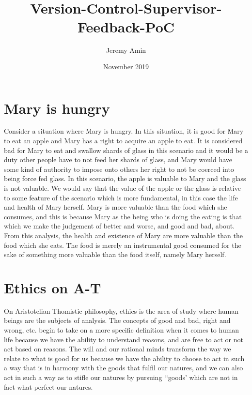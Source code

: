 \documentclass{article}
\title{Version-Control-Supervisor-Feedback-PoC}
\author{Jeremy Amin}
\date{November 2019}
\begin{document}
\maketitle
\tableofcontents

\pagebreak

\section{Mary is hungry}

Consider a situation where Mary is hungry. In this situation, it is good for Mary to eat an apple and Mary has a right to acquire an apple to eat. It is considered bad for Mary to eat and swallow shards of glass in this scenario and it would be a duty other people have to not feed her shards of glass, and Mary would have some kind of authority to impose onto others her right to not be coerced into being force fed glass. In this scenario, the apple is valuable to Mary and the glass is not valuable. We would say that the value of the apple or the glass is relative to some feature of the scenario which is more fundamental, in this case the life and health of Mary herself. Mary is more valuable than the food which she consumes, and this is because Mary as the being who is doing the eating is that which we make the judgement of better and worse, and good and bad, about. From this analysis, the health and existence of Mary are more valuable than the food which she eats. The food is merely an instrumental good consumed for the sake of something more valuable than the food itself, namely Mary herself.

\section{Ethics on A-T}

On Aristotelian-Thomistic philosophy, ethics is the area of study where human beings are the subjects of analysis. The concepts of good and bad, right and wrong, etc. begin to take on a more specific definition when it comes to human life because we have the ability to understand reasons, and are free to act or not act based on reasons. The will and our rational minds transform the way we relate to what is good for us because we have the ability to choose to act in such a way that is in harmony with the goods that fulfil our natures, and we can also act in such a way as to stifle our natures by pursuing ‘‘goods’ which are not in fact what perfect our natures.
\end{document}
